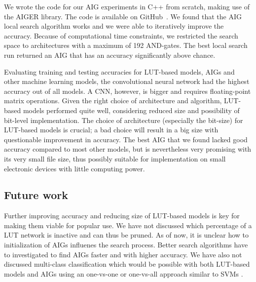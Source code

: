 We wrote the code for our AIG experiments in C++ from scratch, making use of the AIGER library. The code is available on GitHub~\cite{bib:aig_github}. We found that the AIG local search algorithm works and we were able to iteratively improve the accuracy. Because of computational time constraints, we restricted the search space to architectures with a maximum of 192 AND-gates. The best local search run returned an AIG that has an accuracy significantly above chance.

Evaluating training and testing accuracies for LUT-based models, AIGs and other machine learning models, the convolutional neural network had the highest accuracy out of all models. A CNN, however, is bigger and requires floating-point matrix operations. Given the right choice of architecture and algorithm, LUT-based models performed quite well, considering reduced size and possibility of bit-level implementation. The choice of architecture (especially the bit-size) for LUT-based models is crucial; a bad choice will result in a big size with questionable improvement in accuracy. The best AIG that we found lacked good accuracy compared to most other models, but is nevertheless very promising with its very small file size, thus possibly suitable for implementation on small electronic devices with little computing power. 

\subsection{Future work}
Further improving accuracy and reducing size of LUT-based models is key for making them viable for popular use. We have not discussed which percentage of a LUT network is inactive and can thus be pruned. As of now, it is unclear how to initialization of AIGs influenes the search process. Better search algorithms have to investigated to find AIGs faster and with higher accuracy. We have also not discussed multi-class classification which would be possible with both LUT-based models and AIGs using an one-vs-one or one-vs-all approach similar to SVMs \cite{bib:bishop2006pattern}.

